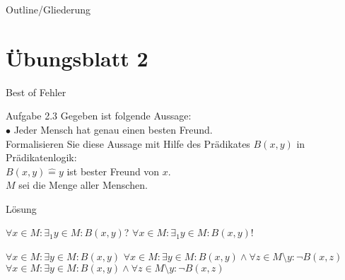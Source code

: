 
\subtitle{Foliensatz 3}
\date{8. November 2012}



\begin{frame}
    \titlepage
\end{frame}

\begin{frame}{Outline/Gliederung}
    \tableofcontents
\end{frame}

\section{Übungsblatt 2}
\begin{frame}{Best of Fehler}
    \begin{block} {Aufgabe 2.3}
        Gegeben ist folgende Aussage: \\
        \vspace{5pt}
        \hspace{10pt}$\bullet$ Jeder Mensch hat genau einen besten Freund.\\
        \vspace{5pt}
        Formalisieren Sie diese Aussage mit Hilfe des Prädikates $B(x,y)$ in Prädikatenlogik:\\
        $B(x,y)\mathrel{\widehat{=}} y$ ist bester Freund von $x$.\\
        $M$ sei die Menge aller Menschen.
    \end{block}
    \begin{exampleblock}{Lösung}
        \begin{overprint}
             $\forall x \in M: \exists_1 y\in M:B(x,y)$?
             \color{red} $\forall x \in M: \exists_1 y\in M:B(x,y)$!\\
        \end{overprint}
        \begin{overprint}
             $\forall x \in M: \exists y \in M: B(x,y)$
             $\forall x \in M: \exists y \in M: B(x,y)\land \forall z \in  M \! \setminus \! y: \lnot B(x,z)$
             \color{darkgreen}$\forall x \in M: \exists y \in M: B(x,y)\land \forall z \in  M \! \setminus \! y: \lnot B(x,z)$
        \end{overprint}
    \end{exampleblock}

\end{frame}	

